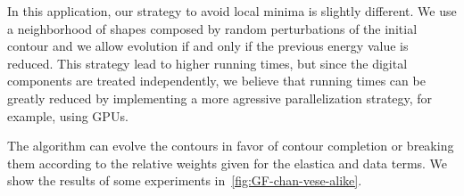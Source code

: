 \documentclass[review]{siamart220329}
\begin{document}
In this application, our strategy to avoid local minima is slightly different. We use a neighborhood of shapes composed by random perturbations of the initial contour and we allow evolution if and only if the previous energy value is reduced. This strategy lead to higher running times, but since the digital components are treated independently, we believe that running times can be greatly reduced by implementing a more agressive parallelization strategy, for example, using GPUs. 

The algorithm can evolve the contours in favor of contour completion or breaking them according to the relative weights given for the elastica and data terms. We show the results of some experiments in~\cref{fig:GF-chan-vese-alike}.

\begin{figure}
\center
{}
\end{figure}
\end{document}

